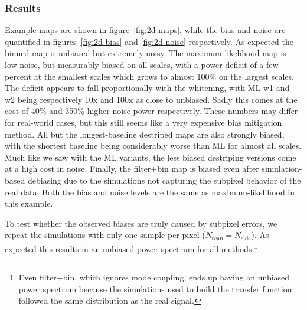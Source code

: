 \documentclass[twocolumn,apj]{aastex63}
\begin{document}
\subsubsection{Results}
\label{sec:2d-results}
Example maps are shown in figure~\ref{fig:2d-maps},
while the bias and noise are quantified in figures~\ref{fig:2d-bias} and \ref{fig:2d-noise}
respectively.
As expected the binned map is unbiased but extremely noisy. The maximum-likelihood
map is low-noise, but measurably biased on all scales, with a power deficit of
a few percent at the smallest scales which grows to almost 100\% on the largest scales.
The deficit appears to fall proportionally with the whitening, with ML w1 and w2
being respectively 10x and 100x as close to unbiased. Sadly this comes at the cost of
40\% and 350\% higher noise power respectively. These numbers may differ for real-world
cases, but this still seems like a very expensive bias mitigation method.
All but the longest-baseline destriped maps are also strongly biased,
with the shortest baseline being considerably worse than ML for almost all scales.
Much like we saw with the ML variants, the less biased destriping versions
come at a high cost in noise. Finally, the filter+bin map is biased even after simulation-based
debiasing due to the simulations not capturing the subpixel behavior of the real data.
Both the bias and noise levels are the same as maximum-likelihood in this example.

To test whether the observed biases are truly caused by subpixel errors, we repeat
the simulations with only one sample per pixel ($N_\text{scan} = N_\text{side}$).
As expected this results in an unbiased power spectrum for all methods.\footnote{
	Even filter+bin, which ignores mode coupling, ends up having an unbiased power
	spectrum because the simulations used to build the transfer function followed
	the same distribution as the real signal.
}
\end{document}

